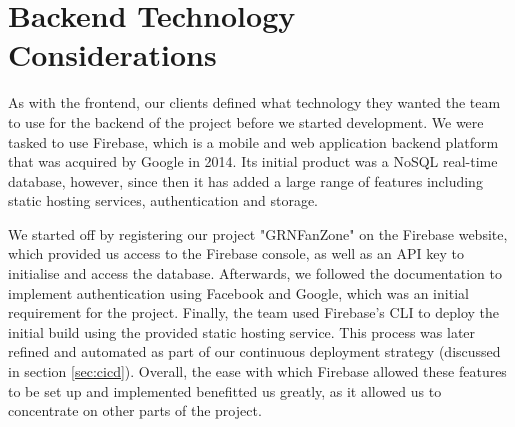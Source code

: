 \documentclass{l3proj}
\begin{document}


\section{Backend Technology Considerations} %
\label{sec:backend}

As with the frontend, our clients defined what technology they wanted the team
 to use for the backend of the project before we started development. We were
 tasked to use Firebase, which is a mobile and web application backend platform that
 was acquired by Google in 2014. Its initial product was a NoSQL real-time database,
 however, since then it has added a large range of features including static
 hosting services, authentication and storage.

We started off by registering our project "GRNFanZone" on the Firebase website,
 which provided us access to the Firebase console, as well as an API key to
 initialise and access the database. Afterwards, we followed the documentation
 to implement authentication using Facebook and Google, which was an initial
 requirement for the project. Finally, the team used Firebase's CLI to deploy
 the initial build using the provided static hosting service. This process
 was later refined and automated as part of our continuous deployment strategy
 (discussed in section \ref{sec:cicd}). Overall, the ease with which Firebase
 allowed these features to be set up and implemented benefitted us greatly,
 as it allowed us to concentrate on other parts of the project.
\end{document}
